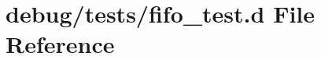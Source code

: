 \hypertarget{fifo__test_8d}{
\section{debug/tests/fifo\_\-test.d File Reference}
\label{fifo__test_8d}
}
